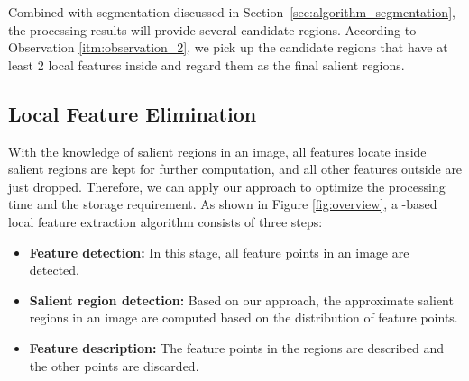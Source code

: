 Combined with segmentation discussed in Section~\ref{sec:algorithm_segmentation}, the processing results will provide several candidate regions. According to Observation \ref{itm:observation_2}, we pick up the candidate regions that have at least 2 local features inside and regard them as the final salient regions.

\subsection{Local Feature Elimination}
\label{sec:algorithm_elimation}

With the knowledge of salient regions in an image, all features locate inside salient regions are kept for further computation, and all other features outside are just dropped. Therefore, we can apply our {\sys} approach to optimize the processing time and the storage requirement. As shown in Figure \ref{fig:overview}, a {\sys}-based local feature extraction algorithm consists of three steps:

\begin{itemize}

\item \textbf{Feature detection:} In this stage, all feature points in an image are detected.

\item \textbf{Salient region detection:} Based on our {\sys} approach, the approximate salient regions in an image are computed based on the distribution of feature points.

\item \textbf{Feature description:} The feature points in the regions are described and the other points are discarded.
\end{itemize}


